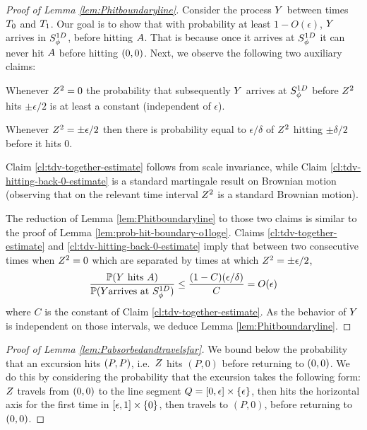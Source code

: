 {{\begin{proof}[Proof of Lemma \ref{lem:Phitboundaryline}]
Consider the process $Y$ between times $T_0$ and
$T_1$. Our goal is to show that with probability at least
$1-O(\epsilon)$, $Y$ arrives in $S^{1D}_{\phi}$, before hitting
$A$. That is because once it arrives at $S^{1D}_{\phi}$ it
can never hit $A$ before hitting $(0,0)$. Next, we observe the
following two auxiliary claims:

\begin{claim}\label{cl:tdv-together-estimate}
  Whenever $Z^2=0$ the probability that subsequently $Y$
  arrives at $S^{1D}_{\phi}$ before $Z^2$ hits $\pm\epsilon/2$ is at
  least a constant (independent of $\epsilon$).
\end{claim}

\begin{claim}\label{cl:tdv-hitting-back-0-estimate}
  Whenever $Z^2=\pm\epsilon/2$ then there is probability equal to
  $\epsilon/\delta$ of $Z^2$ hitting $\pm\delta/2$ before it hits $0$.
\end{claim}

Claim \ref{cl:tdv-together-estimate} follows from scale invariance, while
Claim \ref{cl:tdv-hitting-back-0-estimate} is a standard martingale result on
Brownian motion (observing that on the relevant time interval $Z^2$ is a
standard Brownian motion).

The reduction of Lemma \ref{lem:Phitboundaryline} to those two claims is
similar to the proof of Lemma \ref{lem:prob-hit-boundary-o1loge}. Claims
\ref{cl:tdv-together-estimate} and \ref{cl:tdv-hitting-back-0-estimate} imply
that between two consecutive times when $Z^2=0$ which are separated
by times at which $Z^2 = \pm\epsilon/2$,
\[
\frac{\mathbb{P}(Y\text{ hits }A)}{\mathbb{P}(Y\text{arrives at }S^{1D}_{\phi})}
\le \frac{(1-C)(\epsilon/\delta)}{C} =O(\epsilon)
\]
where $C$ is the constant of Claim \ref{cl:tdv-together-estimate}. As the
behavior of $Y$ is independent on those intervals, we deduce Lemma
\ref{lem:Phitboundaryline}.

\end{proof}
}
\begin{proof}[Proof of Lemma \ref{lem:Pabsorbedandtravelsfar}]
\newcommand{\rotfarpoint}{(P,0)}
\newcommand{\segment}{[\epsilon,1] \cross \{0\}}
We bound below the probability that an excursion hits $(P,P)$,
i.e.\ $Z$ hits $\rotfarpoint$ before returning to $(0,0)$.
We do this by considering the probability that the excursion takes
the following form: $Z$ travels from $(0,0)$ to the line
segment $Q = [0, \epsilon] \times \{\epsilon\}$, then hits the horizontal
axis for the first time in $\segment$, then travels to $\rotfarpoint$,
before returning to $(0,0)$.


\end{proof}}
